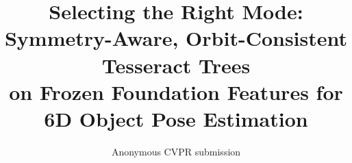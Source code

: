 \documentclass[10pt,twocolumn,letterpaper]{article}
\title{Selecting the Right Mode: Symmetry-Aware, Orbit-Consistent Tesseract Trees\\on Frozen Foundation Features for 6D Object Pose Estimation}
\author{Anonymous CVPR submission}
\begin{document}








{
    \small
    
    
}


\clearpage

\end{document}
